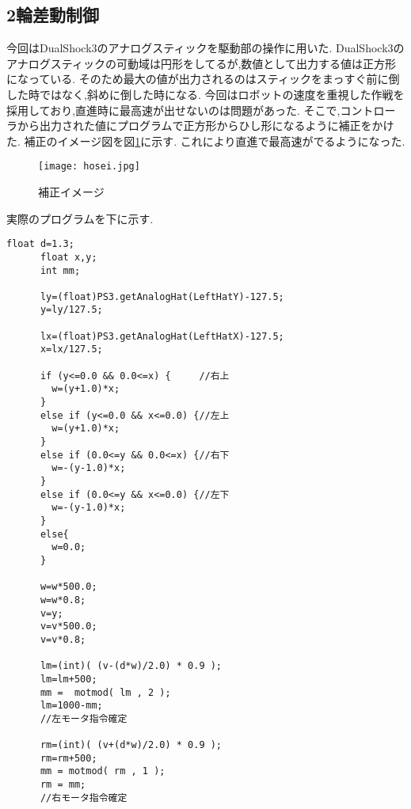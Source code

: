 \documentclass[12pt,oneside]{paper}
\begin{document}
\subsection{2輪差動制御}
今回はDualShock3のアナログスティックを駆動部の操作に用いた.
DualShock3のアナログスティックの可動域は円形をしてるが,数値として出力する値は正方形になっている.
そのため最大の値が出力されるのはスティックをまっすぐ前に倒した時ではなく,斜めに倒した時になる.
今回はロボットの速度を重視した作戦を採用しており,直進時に最高速が出せないのは問題があった.
そこで,コントローラから出力された値にプログラムで正方形からひし形になるように補正をかけた.
補正のイメージ図を図\ref{fig:hosei}に示す.
これにより直進で最高速がでるようになった.
\begin{figure}[H]
 \begin{center}
  \texttt{[image: hosei.jpg]}
 \end{center}
 \caption{補正イメージ}
 \label{fig:hosei}
\end{figure}
実際のプログラムを下に示す.
\begin{lstlisting}[caption=補正Program,label=prg2]
      float d=1.3;
      float x,y;
      int mm;
      
      ly=(float)PS3.getAnalogHat(LeftHatY)-127.5;
      y=ly/127.5;
      
      lx=(float)PS3.getAnalogHat(LeftHatX)-127.5;
      x=lx/127.5;
      
      if (y<=0.0 && 0.0<=x) {     //右上
        w=(y+1.0)*x;
      }
      else if (y<=0.0 && x<=0.0) {//左上
        w=(y+1.0)*x;
      }
      else if (0.0<=y && 0.0<=x) {//右下
        w=-(y-1.0)*x;
      }
      else if (0.0<=y && x<=0.0) {//左下
        w=-(y-1.0)*x;
      }
      else{
        w=0.0;
      }
      
      w=w*500.0;
      w=w*0.8;
      v=y;
      v=v*500.0;
      v=v*0.8;
      
      lm=(int)( (v-(d*w)/2.0) * 0.9 );
      lm=lm+500;
      mm =  motmod( lm , 2 );
      lm=1000-mm;
      //左モータ指令確定
   
      rm=(int)( (v+(d*w)/2.0) * 0.9 );
      rm=rm+500;
      mm = motmod( rm , 1 );
      rm = mm;
      //右モータ指令確定

\end{lstlisting}
\end{document}
